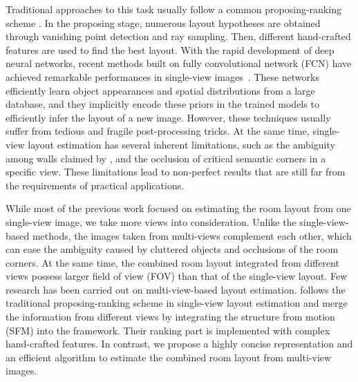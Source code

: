 Traditional approaches to this task usually follow a common proposing-ranking scheme \cite{hedau2009recovering,wang2013discriminative,gupta2010estimating,hedau2010thinking}. In the proposing stage, numerous layout hypotheses are obtained through vanishing point detection and ray sampling. Then, different hand-crafted features are used to find the best layout. 
With the rapid development of deep neural networks, recent methods built on fully convolutional network (FCN) have achieved remarkable performances in single-view images~\cite{mallya2015learning,dasgupta2016delay,ren2016coarse,zhao2017physics,LeeRoomNet17}. These networks efficiently learn object appearances and spatial distributions from a large database, and they implicitly encode these priors in the trained models to efficiently infer the layout of a new image. 
%
However, these techniques usually suffer from tedious and fragile post-processing tricks. At the same time, single-view layout estimation has several inherent limitations, such as the ambiguity among walls claimed by \cite{dasgupta2016delay}, and the occlusion of critical semantic corners in a specific view. These limitations lead to non-perfect results that are still far from the requirements of practical applications.

%
While most of the previous work focused on estimating the room layout from one single-view image, we take more views into consideration. Unlike the single-view-based methods, the images taken from multi-views complement each other, which can ease the ambiguity caused by cluttered objects and occlusions of the room corners. At the same time, the combined room layout integrated from different views possess larger field of view (FOV) than that of the single-view layout. 
%
Few research has been carried out on multi-view-based layout estimation. \cite{bao2014understanding} follows the traditional proposing-ranking scheme in single-view layout estimation and merge the information from different views by integrating the structure from motion (SFM) into the framework. Their ranking part is implemented with complex hand-crafted features. 
%
In contrast, we propose a highly concise representation and an efficient algorithm to estimate the combined room layout from multi-view images.


